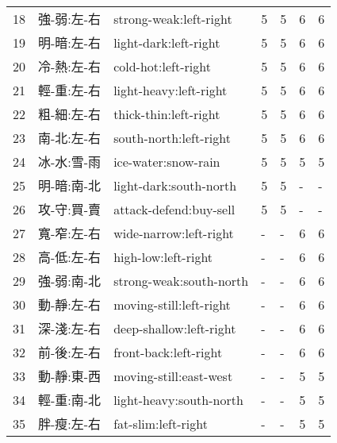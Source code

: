 \begin{longtable}[c]{rllllll}
        18 & 強-弱:左-右 & strong-weak:left-right   & 5 & 5 & 6 & 6 \\
        19 & 明-暗:左-右 & light-dark:left-right    & 5 & 5 & 6 & 6 \\
        20 & 冷-熱:左-右 & cold-hot:left-right      & 5 & 5 & 6 & 6 \\
        21 & 輕-重:左-右 & light-heavy:left-right   & 5 & 5 & 6 & 6 \\
        22 & 粗-細:左-右 & thick-thin:left-right    & 5 & 5 & 6 & 6 \\
        23 & 南-北:左-右 & south-north:left-right   & 5 & 5 & 6 & 6 \\
        24 & 冰-水:雪-雨 & ice-water:snow-rain      & 5 & 5 & 5 & 5 \\
        25 & 明-暗:南-北 & light-dark:south-north   & 5 & 5 & - & - \\
        26 & 攻-守:買-賣 & attack-defend:buy-sell   & 5 & 5 & - & - \\
        27 & 寬-窄:左-右 & wide-narrow:left-right   & - & - & 6 & 6 \\
        28 & 高-低:左-右 & high-low:left-right      & - & - & 6 & 6 \\
        29 & 強-弱:南-北 & strong-weak:south-north  & - & - & 6 & 6 \\
        30 & 動-靜:左-右 & moving-still:left-right  & - & - & 6 & 6 \\
        31 & 深-淺:左-右 & deep-shallow:left-right  & - & - & 6 & 6 \\
        32 & 前-後:左-右 & front-back:left-right    & - & - & 6 & 6 \\
        33 & 動-靜:東-西 & moving-still:east-west   & - & - & 5 & 5 \\
        34 & 輕-重:南-北 & light-heavy:south-north  & - & - & 5 & 5 \\
        35 & 胖-瘦:左-右 & fat-slim:left-right      & - & - & 5 & 5 \\
        \bottomrule
\end{longtable}